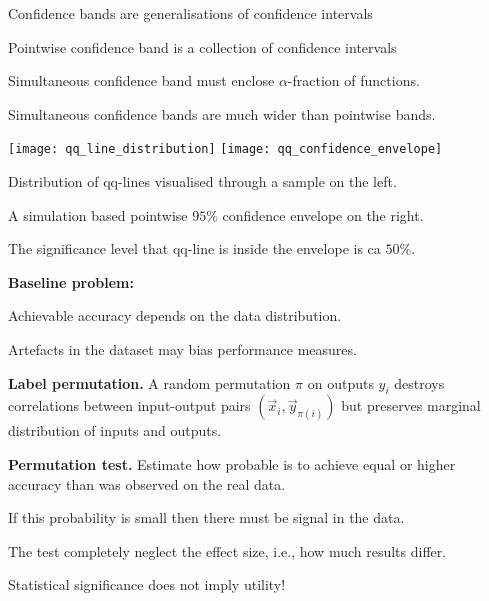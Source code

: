 \documentclass[landscape,footrule]{foils}
\begin{document}
Confidence bands are generalisations of confidence intervals
\begin{triangles}
\item Pointwise confidence band is a collection of confidence intervals
\item Simultaneous confidence band must enclose $\alpha$-fraction of functions.  
\item Simultaneous confidence bands are much wider than pointwise bands.  
\end{triangles}


\enlargethispage{0.5cm}
\centerline{
\texttt{[image: qq\_line\_distribution]}
\texttt{[image: qq\_confidence\_envelope]}}
\begin{triangles}
\item Distribution of qq-lines visualised through a sample on the left.
\item A simulation based pointwise $95\%$ confidence envelope on the right.
\item The significance level that qq-line is inside the envelope is ca $50\%$.
\end{triangles}


\textbf{Baseline problem:}
\begin{triangles}
\item Achievable accuracy depends on the data distribution. 
\item Artefacts in the dataset may bias performance measures.
\end{triangles}
\vspace*{2ex}

\textbf{Label permutation.}
A random permutation $\pi$ on outputs $y_i$ destroys correlations between input-output pairs $(\vec{x}_{i}, \vec{y}_{\pi(i)})$ but preserves marginal distribution of inputs and outputs. 
\vspace*{2ex}


\textbf{Permutation test.}
Estimate how probable is to achieve equal or higher accuracy than was observed on the real data.
\begin{triangles}
\item If this probability is small then there must be signal in the data. 
\item The test completely neglect the effect size, i.e., how much results differ.
\item Statistical significance does not imply utility!      
\end{triangles}  
\end{document}
